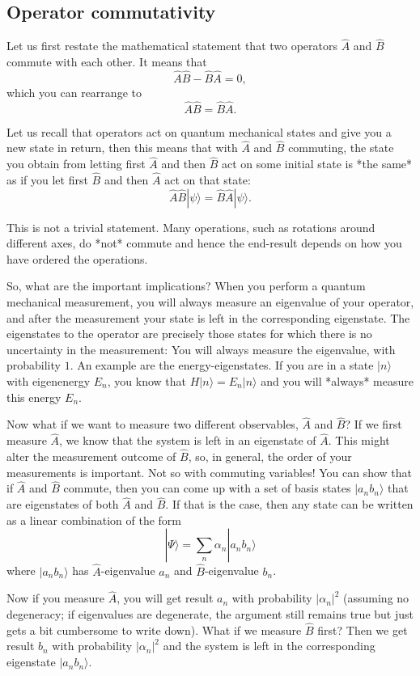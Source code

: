 \subsection{Operator commutativity}

Let us first restate the mathematical statement that two operators $\hat A$ and $\hat B$ commute with each other. It means that
$$\hat A \hat B - \hat B \hat A = 0,$$
which you can rearrange to 
$$\hat A \hat B = \hat B \hat A.$$

Let us recall that operators act on quantum mechanical states and give you a new state in return, then this means that with $\hat A$ and $\hat B$ commuting, the state you obtain from letting first $\hat A$ and then $\hat B$ act on some initial state is *the same* as if you let first $\hat B$ and then $\hat A$ act on that state:
$$\hat A \hat B | \psi \rangle = \hat B \hat A | \psi \rangle.$$

This is not a trivial statement. Many operations, such as rotations around different axes, do *not* commute and hence the end-result depends on how you have ordered the operations.

So, what are the important implications? When you perform a quantum mechanical measurement, you will always measure an eigenvalue of your operator, and after the measurement your state is left in the corresponding eigenstate. The eigenstates to the operator are precisely those states for which there is no uncertainty in the measurement: You will always measure the eigenvalue, with probability $1$.
An example are the energy-eigenstates. If you are in a state $|n\rangle$ with eigenenergy $E_n$, you know that $H|n\rangle = E_n |n \rangle$ and you will *always* measure this energy $E_n$.

Now what if we want to measure two different observables, $\hat A$ and $\hat B$? If we first measure $\hat A$, we know that the system is left in an eigenstate of $\hat A$. This might alter the measurement outcome of $\hat B$, so, in general, the order of your measurements is important. Not so with commuting variables! You can show that if $\hat A$ and $\hat B$ commute, then you can come up with a set of basis states $| a_n b_n\rangle$ that are eigenstates of both $\hat A$ and $\hat B$. If that is the case, then any state can be written as a linear combination of the form
$$| \Psi \rangle = \sum_n \alpha_n | a_n b_n \rangle$$
where $|a_n b_n\rangle$ has $\hat A$-eigenvalue $a_n$ and $\hat B$-eigenvalue $b_n$.

Now if you measure $\hat A$, you will get result $a_n$ with probability $|\alpha_n|^2$ (assuming no degeneracy; if eigenvalues are degenerate, the argument still remains true but just gets a bit cumbersome to write down). What if we measure $\hat B$ first? Then we get result $b_n$ with probability $|\alpha_n|^2$ and the system is left in the corresponding eigenstate $|a_n b_n \rangle$. 

